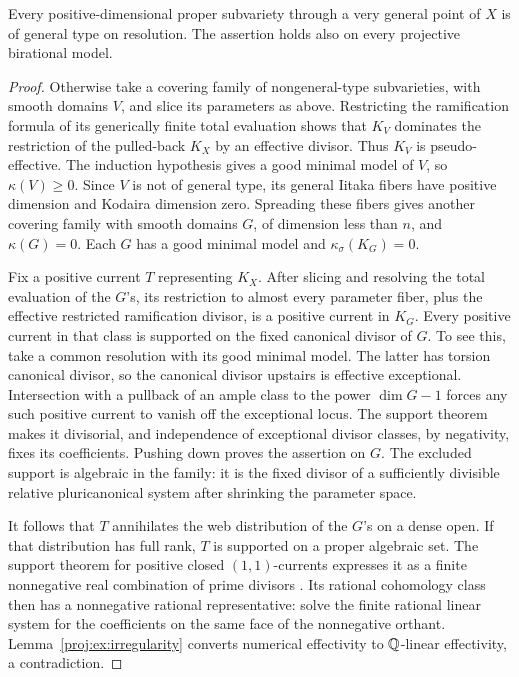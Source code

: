 \begin{proposition}\label{proj:prop:general-type}
Every positive-dimensional proper subvariety through a very general
point of \(X\) is of general type on resolution. The assertion holds
also on every projective birational model.
\end{proposition}
\begin{proof}
Otherwise take a covering family of nongeneral-type subvarieties,
with smooth domains \(V\), and slice its parameters as above.
Restricting the ramification formula of its generically finite
total evaluation shows that \(K_V\) dominates the restriction of
the pulled-back \(K_X\) by an effective divisor. Thus \(K_V\) is
pseudo-effective. The induction hypothesis gives a good minimal
model of \(V\), so \(\kappa(V)\geq0\). Since \(V\) is not of general
type, its general Iitaka fibers have positive dimension and
Kodaira dimension zero. Spreading these fibers gives another
covering family with smooth domains \(G\), of dimension less than
\(n\), and \(\kappa(G)=0\). Each \(G\) has a good minimal model and
\(\kappa_\sigma(K_G)=0\).

Fix a positive current \(T\) representing \(K_X\). After slicing and
resolving the total evaluation of the \(G\)'s, its restriction to
almost every parameter fiber, plus the effective restricted
ramification divisor, is a positive current in \(K_G\).
Every positive current in that class is supported on the fixed
canonical divisor of \(G\). To see this, take a common resolution
with its good minimal model. The latter has torsion canonical
divisor, so the canonical divisor upstairs is effective exceptional.
Intersection with a pullback of an ample class to the power
\(\dim G-1\) forces any such positive current to vanish off the
exceptional locus. The support theorem makes it divisorial, and
independence of exceptional divisor classes, by negativity, fixes
its coefficients. Pushing down proves the assertion on \(G\).
The excluded support is algebraic in the family: it is the fixed
divisor of a sufficiently divisible relative pluricanonical
system after shrinking the parameter space.

It follows that \(T\) annihilates the web distribution of the
\(G\)'s on a dense open. If that distribution has full rank, \(T\)
is supported on a proper algebraic set. The support theorem for
positive closed \((1,1)\)-currents expresses it as a finite
nonnegative real combination of prime divisors
\cite{Proj-Siu1974,Proj-Demailly2012}. Its rational cohomology class then has
a nonnegative rational representative: solve the finite rational
linear system for the coefficients on the same face of the
nonnegative orthant. Lemma~\ref{proj:ex:irregularity} converts numerical
effectivity to \(\mathbb{Q}\)-linear effectivity, a contradiction.


\end{proof}
